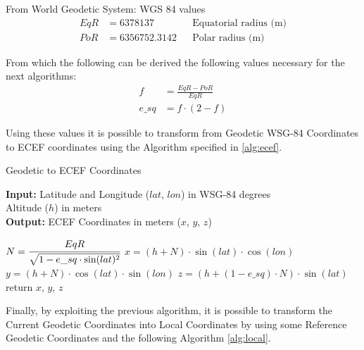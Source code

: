 
From World Geodetic System: WGS 84 values
\begin{align}
    EqR &= 6378137 && \text{Equatorial radius (m)} \\
    PoR &= 6356752.3142 && \text{Polar radius (m)}
\end{align}

From which the following can be derived the following values necessary for the next algorithms:
\begin{align}
    f &= \frac{EqR - PoR}{EqR} \\
    e\_sq &= f \cdot (2-f)
\end{align}

Using these values it is possible to transform from Geodetic WSG-84 Coordinates to ECEF coordinates using the  Algorithm specified in \ref{alg:ecef}.


\begin{algorithm}[H]
\caption{Geodetic to ECEF Coordinates }
\label{alg:ecef}
  \hspace*{\algorithmicindent} \textbf{Input:} Latitude and Longitude ($lat$, $lon$) in WSG-84 degrees\\
  \hspace*{4em} Altitude ($h$) in meters\\
  \hspace*{\algorithmicindent} \textbf{Output:} ECEF Coordinates in meters ($x$, $y$, $z$)
  \begin{algorithmic}[1]
  \STATE $N = \cfrac{EqR}{\sqrt{1 - e\_sq \cdot \sin(lat)^2}}$
  \STATE $x = (h + N) \cdot \sin(lat) \cdot \cos(lon)$
  \STATE $y = (h + N) \cdot \cos(lat) \cdot \sin(lon)$
  \STATE $z = (h + (1 - e\_sq) \cdot N) \cdot \sin(lat)$
  \STATE return $x$, $y$, $z$
    \end{algorithmic}
\end{algorithm}

Finally, by exploiting the previous algorithm, it is possible to transform the Current Geodetic Coordinates into Local Coordinates by using some Reference Geodetic Coordinates and the following Algorithm \ref{alg:local}.

